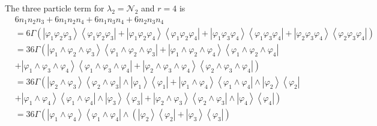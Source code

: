\documentclass[aps,preprint]{revtex4}%
\begin{document}
The three particle term for $\lambda_{2}=\mathcal{N}_{2}$ and $r=4$ is
\begin{align*}
&  6n_{1}n_{2}n_{3}+6n_{1}n_{2}n_{4}+6n_{1}n_{3}n_{4}+6n_{2}n_{3}n_{4}\\
&  =6\Gamma\left(  \left\vert \varphi_{1}\varphi_{2}\varphi_{3}\right\rangle
\left\langle \varphi_{1}\varphi_{2}\varphi_{3}\right\vert +\left\vert
\varphi_{1}\varphi_{2}\varphi_{4}\right\rangle \left\langle \varphi_{1}%
\varphi_{2}\varphi_{4}\right\vert +\left\vert \varphi_{1}\varphi_{3}%
\varphi_{4}\right\rangle \left\langle \varphi_{1}\varphi_{3}\varphi
_{4}\right\vert +\left\vert \varphi_{2}\varphi_{3}\varphi_{4}\right\rangle
\left\langle \varphi_{2}\varphi_{3}\varphi_{4}\right\vert \right) \\
&  =36\Gamma\left(  \left\vert \varphi_{1}\wedge\varphi_{2}\wedge\varphi
_{3}\right\rangle \left\langle \varphi_{1}\wedge\varphi_{2}\wedge\varphi
_{3}\right\vert +\left\vert \varphi_{1}\wedge\varphi_{2}\wedge\varphi
_{4}\right\rangle \left\langle \varphi_{1}\wedge\varphi_{2}\wedge\varphi
_{4}\right\vert \right. \\
&  \left.  +\left\vert \varphi_{1}\wedge\varphi_{3}\wedge\varphi
_{4}\right\rangle \left\langle \varphi_{1}\wedge\varphi_{3}\wedge\varphi
_{4}\right\vert +\left\vert \varphi_{2}\wedge\varphi_{3}\wedge\varphi
_{4}\right\rangle \left\langle \varphi_{2}\wedge\varphi_{3}\wedge\varphi
_{4}\right\vert \right) \\
&  =36\Gamma\left(  \left\vert \varphi_{2}\wedge\varphi_{3}\right\rangle
\left\langle \varphi_{2}\wedge\varphi_{3}\right\vert \wedge\left\vert
\varphi_{1}\right\rangle \left\langle \varphi_{1}\right\vert +\left\vert
\varphi_{1}\wedge\varphi_{4}\right\rangle \left\langle \varphi_{1}%
\wedge\varphi_{4}\right\vert \wedge\left\vert \varphi_{2}\right\rangle
\left\langle \varphi_{2}\right\vert \right. \\
&  \left.  +\left\vert \varphi_{1}\wedge\varphi_{4}\right\rangle \left\langle
\varphi_{1}\wedge\varphi_{4}\right\vert \wedge\left\vert \varphi
_{3}\right\rangle \left\langle \varphi_{3}\right\vert +\left\vert \varphi
_{2}\wedge\varphi_{3}\right\rangle \left\langle \varphi_{2}\wedge\varphi
_{3}\right\vert \wedge\left\vert \varphi_{4}\right\rangle \left\langle
\varphi_{4}\right\vert \right) \\
&  =36\Gamma\left(  \left\vert \varphi_{1}\wedge\varphi_{4}\right\rangle
\left\langle \varphi_{1}\wedge\varphi_{4}\right\vert \wedge\left(  \left\vert
\varphi_{2}\right\rangle \left\langle \varphi_{2}\right\vert +\left\vert
\varphi_{3}\right\rangle \left\langle \varphi_{3}\right\vert \right)  \right.

\end{align*}
\end{document}
